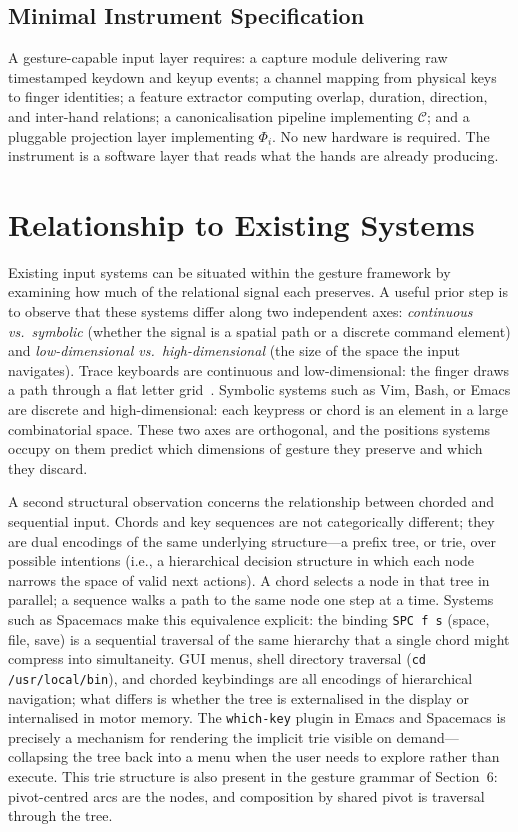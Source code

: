 \documentclass[11pt, a4paper]{article}
\begin{document}
\subsection{Minimal Instrument Specification}

A gesture-capable input layer requires: a capture module delivering raw
timestamped keydown and keyup events; a channel mapping from physical
keys to finger identities; a feature extractor computing overlap,
duration, direction, and inter-hand relations; a canonicalisation
pipeline implementing $\mathcal{C}$; and a pluggable projection layer
implementing $\Phi_i$. No new hardware is required. The instrument is a
software layer that reads what the hands are already producing.

\section{Relationship to Existing Systems}

Existing input systems can be situated within the gesture framework by
examining how much of the relational signal each preserves. A useful
prior step is to observe that these systems differ along two independent
axes: \emph{continuous vs.\ symbolic} (whether the signal is a spatial
path or a discrete command element) and \emph{low-dimensional
vs.\ high-dimensional} (the size of the space the input navigates).
Trace keyboards are continuous and low-dimensional: the finger draws a
path through a flat letter grid~\cite{zhai2012}. Symbolic systems such
as Vim, Bash, or Emacs are discrete and high-dimensional: each keypress
or chord is an element in a large combinatorial space. These two axes
are orthogonal, and the positions systems occupy on them predict which
dimensions of gesture they preserve and which they discard.

A second structural observation concerns the relationship between chorded
and sequential input. Chords and key sequences are not categorically
different; they are dual encodings of the same underlying structure---a
prefix tree, or trie, over possible intentions (i.e., a hierarchical
decision structure in which each node narrows the space of valid next
actions). A chord selects a node in that tree in parallel; a sequence
walks a path to the same node one step at a time. Systems such as
Spacemacs make this equivalence explicit: the binding
\texttt{SPC\,f\,s} (space, file, save) is a sequential traversal of the
same hierarchy that a single chord might compress into simultaneity. GUI
menus, shell directory traversal (\texttt{cd /usr/local/bin}), and
chorded keybindings are all encodings of hierarchical navigation; what
differs is whether the tree is externalised in the display or
internalised in motor memory. The \texttt{which-key} plugin in Emacs and
Spacemacs is precisely a mechanism for rendering the implicit trie
visible on demand---collapsing the tree back into a menu when the user
needs to explore rather than execute. This trie structure is also present
in the gesture grammar of Section~6: pivot-centred arcs are the nodes,
and composition by shared pivot is traversal through the tree.
\end{document}
